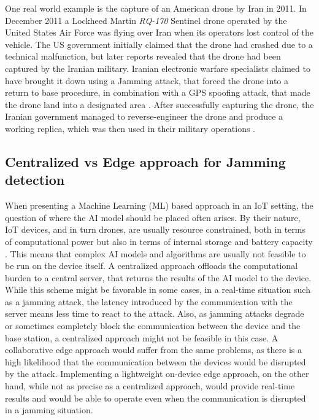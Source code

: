 \documentclass[futureinternet,article,submit,pdftex,moreauthors]{Definitions/mdpi}
\begin{document}
One real world example is the capture of an American drone by Iran in 2011. 
In December 2011 a Lockheed Martin \textit{RQ-170} Sentinel drone operated by the United States Air Force was flying over Iran when its operators lost control of the vehicle. The US government initially claimed that the drone had crashed due to a technical malfunction, but later reports revealed that the drone had been captured by the Iranian military. 
Iranian electronic warfare specialists claimed to have brought it down using a Jamming attack, that forced the drone into a return to base procedure, in combination with a  GPS spoofing attack, that made the drone land into a designated area \cite{RQ170DroneOwano}. 
After successfully capturing the drone, the Iranian government managed to reverse-engineer the drone and produce a working replica, which was then used in their military operations \cite{IranianUAVGross}.

\subsection{Centralized vs Edge approach for Jamming detection}

When presenting a Machine Learning (ML) based approach in an IoT setting, the question of where the AI model should be placed often arises. By their nature, IoT devices, and in turn drones, are usually resource constrained, 
both in terms of computational power but also in terms of internal storage and battery capacity \cite{6GSecurity-Chorti}. This means that complex AI models and algorithms are usually not feasible to be run on the device itself. A centralized approach 
offloads the computational burden to a central server, that returns the results of the AI model to the device. While this scheme might be favorable in some cases, in a real-time situation such as a jamming attack, the latency introduced by the
communication with the server means less time to react to the attack. Also, as jamming attacks degrade or sometimes completely block the communication between the device and the base station, a centralized approach might not be feasible in this case.
A collaborative edge approach would suffer from the same problems, as there is a high likelihood that the communication between the devices would be disrupted by the attack. 
Implementing a lightweight on-device edge approach, on the other hand, while not as precise as a centralized approach, would provide real-time results and would be able to operate even when the communication is disrupted in a jamming situation. 
\end{document}
